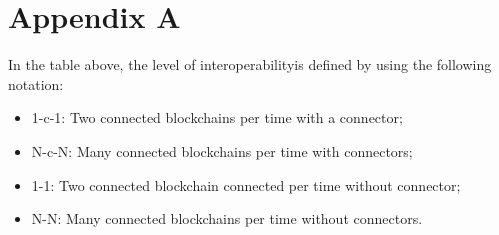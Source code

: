 

\chapter{Appendix A}
\label{app:A}

 

In the table above, the level of interoperability\footnotemark is defined by using the following notation:
\begin{itemize}
    \item 1-c-1: Two connected blockchains per time with a connector;
    \item N-c-N: Many connected blockchains per time with connectors;
    \item 1-1: Two connected blockchain connected per time without connector;
    \item N-N: Many connected blockchains per time without connectors.
\end{itemize}







